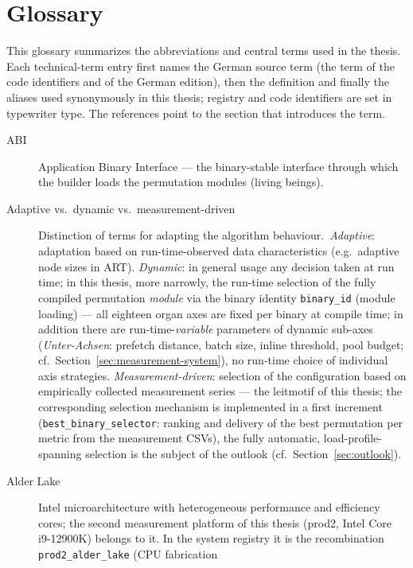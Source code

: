\chapter{Glossary}\label{app:glossary}

This glossary summarizes the abbreviations and central terms used in the thesis. Each
technical-term entry first names the German source term (the term of the code identifiers and of
the German edition), then the definition and finally the aliases used synonymously in this thesis;
registry and code identifiers are set in typewriter type. The references point to the section that
introduces the term.

\begin{description}
  \item[ABI] Application Binary Interface --- the binary-stable interface through which the builder
  loads the permutation modules (living beings).
  \item[Adaptive vs.\ dynamic vs.\ measurement-driven] Distinction of terms for adapting the
  algorithm behaviour.\ \emph{Adaptive}: adaptation based on run-time-observed data characteristics
  (e.g.\ adaptive node sizes in ART)\@. \emph{Dynamic}: in general usage any decision taken at run
  time; in this thesis, more narrowly, the run-time selection of the fully compiled
  permutation \emph{module} via the binary identity \texttt{binary\_id} (module loading) --- all
  eighteen organ axes are fixed per binary at compile time; in addition there are
  run-time-\emph{variable} parameters of dynamic sub-axes (\emph{Unter-Achsen}: prefetch distance,
  batch size, inline threshold, pool budget; cf.\ Section~\ref{sec:measurement-system}), no
  run-time choice of individual axis strategies.
  \emph{Measurement-driven}: selection of the configuration based on empirically collected
  measurement series --- the leitmotif of this thesis; the corresponding selection mechanism is
  implemented in a first increment (\texttt{best\_binary\_selector}: ranking and delivery of the
  best permutation per metric from the measurement CSVs), the fully automatic,
  load-profile-spanning selection is the subject of the outlook (cf.\ Section~\ref{sec:outlook}).
  \item[Alder Lake] Intel microarchitecture with heterogeneous performance and efficiency cores; the
  second measurement platform of this thesis (prod2, Intel Core i9-12900K) belongs to it. In the
  system registry it is the recombination \texttt{prod2\_alder\_lake} (CPU fabrication

\end{description}
